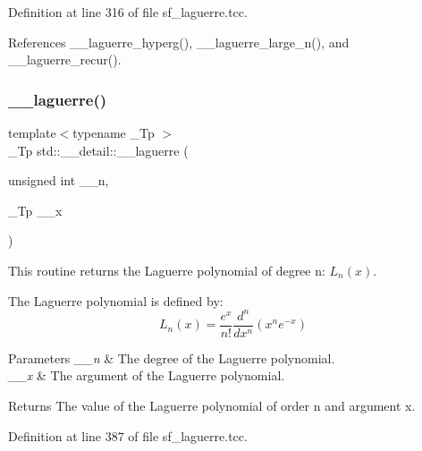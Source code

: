Definition at line 316 of file sf\+\_\+laguerre.\+tcc.



References \+\_\+\+\_\+laguerre\+\_\+hyperg(), \+\_\+\+\_\+laguerre\+\_\+large\+\_\+n(), and \+\_\+\+\_\+laguerre\+\_\+recur().

\mbox{\label{namespacestd_1_1____detail_aa714c4983a3cb7d9d18e0c2c5a8f6826}} 
\subsubsection{\texorpdfstring{\+\_\+\+\_\+laguerre()}{\_\_laguerre()}\hspace{0.1cm}{\footnotesize\ttfamily [2/2]}}
{\footnotesize\ttfamily template$<$typename \+\_\+\+Tp $>$ \\
\+\_\+\+Tp std\+::\+\_\+\+\_\+detail\+::\+\_\+\+\_\+laguerre (\begin{DoxyParamCaption}\item[{unsigned int}]{\+\_\+\+\_\+n,  }\item[{\+\_\+\+Tp}]{\+\_\+\+\_\+x }\end{DoxyParamCaption})}



This routine returns the Laguerre polynomial of degree n\+: $ L_n(x) $. 

The Laguerre polynomial is defined by\+: \[ L_n(x) = \frac{e^x}{n!} \frac{d^n}{dx^n} (x^ne^{-x}) \]


\begin{DoxyParams}{Parameters}
{\em \+\_\+\+\_\+n} & The degree of the Laguerre polynomial. \\
\hline
{\em \+\_\+\+\_\+x} & The argument of the Laguerre polynomial. \\
\hline
\end{DoxyParams}
\begin{DoxyReturn}{Returns}
The value of the Laguerre polynomial of order n and argument x. 
\end{DoxyReturn}


Definition at line 387 of file sf\+\_\+laguerre.\+tcc.

\mbox{\label{namespacestd_1_1____detail_a7908be328a4546d77802076196ae4396}} 
